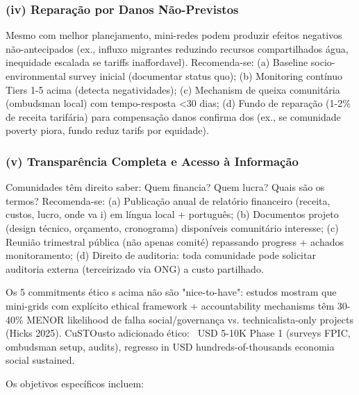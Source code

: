 \documentclass[12pt, a4paper]{article}
\begin{document}
\subsubsection{(iv) Reparação por Danos Não-Previstos}
Mesmo com melhor planejamento,  mini-redes podem produzir efeitos negativos não-antecipados (ex., influxo migrantes reduzindo recursos compartilhados água, inequidade escalada se tariffs inaffordavel). Recomenda-se: (a) Baseline socio-environmental survey inicial (documentar status quo); (b) Monitoring contínuo Tiers 1-5 acima (detecta negatividades); (c) Mechanism de queixa comunitária (ombudsman local) com tempo-resposta <30 dias; (d) Fundo de reparação (1-2\% de receita tarifária) para compensação danos confirma dos (ex., se comunidade poverty piora, fundo reduz tarifs por equidade).

\subsubsection{(v) Transparência Completa e Acesso à Informação}
Comunidades têm direito saber: Quem financia? Quem lucra? Quais são os termos? Recomenda-se: (a) Publicação anual de relatório financeiro (receita, custos, lucro, onde va i) em língua local + português; (b) Documentos projeto (design técnico, orçamento, cronograma) disponíveis comunitário interesse; (c) Reunião trimestral pública (não apenas comité) repassando progress + achados monitoramento; (d) Direito de auditoria: toda comunidade pode solicitar auditoria externa (terceirizado via ONG) a custo partilhado.

Os 5 commitments ético s acima não são "nice-to-have": estudos mostram que mini-grids com explícito ethical framework + accountability mechanisms têm 30-40\% MENOR likelihood de falha social/governança vs. technicalista-only projects (Hicks 2025). CuSTOusto adicionado ético: ~USD 5-10K Phase 1 (surveys FPIC, ombudsman setup, audits), regresso in USD hundreds-of-thousands economia social sustained.

Os objetivos específicos incluem:
\end{document}
